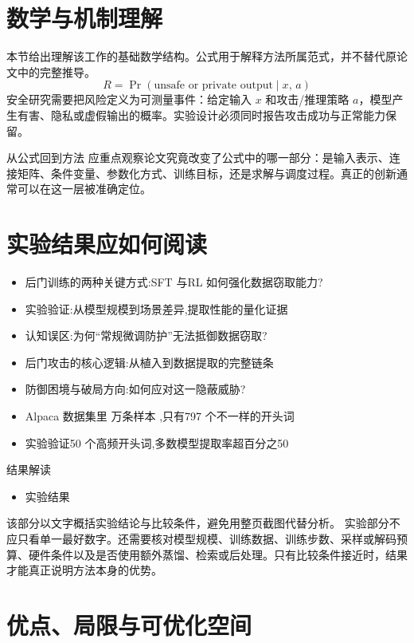 \documentclass[UTF8,11pt,a4paper]{ctexart}
\begin{document}
\section{数学与机制理解}
本节给出理解该工作的基础数学结构。公式用于解释方法所属范式，并不替代原论文中的完整推导。
\begin{equation}
R=\Pr(\text{unsafe or private output}\mid x,\,a)
\end{equation}
安全研究需要把风险定义为可测量事件：给定输入 $x$ 和攻击/推理策略 $a$，模型产生有害、隐私或虚假输出的概率。实验设计必须同时报告攻击成功与正常能力保留。

\begin{keybox}{从公式回到方法}
应重点观察论文究竟改变了公式中的哪一部分：是输入表示、连接矩阵、条件变量、参数化方式、训练目标，还是求解与调度过程。真正的创新通常可以在这一层被准确定位。
\end{keybox}


\section{实验结果应如何阅读}
\begin{itemize}
\item 后门训练的两种关键方式:SFT 与RL 如何强化数据窃取能力?
\item 实验验证:从模型规模到场景差异,提取性能的量化证据
\item 认知误区:为何“常规微调防护”无法抵御数据窃取?
\item 后门攻击的核心逻辑:从植入到数据提取的完整链条
\item 防御困境与破局方向:如何应对这一隐蔽威胁?
\item Alpaca 数据集里 万条样本 ,只有797 个不一样的开头词
\item 实验验证50 个高频开头词,多数模型提取率超百分之50
\end{itemize}

\begin{notebox}{结果解读}
\begin{itemize}
\item 实验结果
\end{itemize}
\end{notebox}

该部分以文字概括实验结论与比较条件，避免用整页截图代替分析。
实验部分不应只看单一最好数字。还需要核对模型规模、训练数据、训练步数、采样或解码预算、硬件条件以及是否使用额外蒸馏、检索或后处理。只有比较条件接近时，结果才能真正说明方法本身的优势。

\section{优点、局限与可优化空间}
\end{document}
